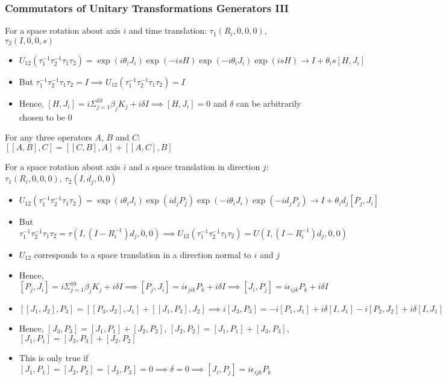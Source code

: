 \documentclass[8pt,t,mathserif,aspectratio=169]{beamer}
\begin{document}
\begin{frame}
  \frametitle{Commutators of Unitary Transformations Generators III}
  \vspace{1mm}
  For a space rotation about axis $i$ and time translation: $\tau_1(R_i,0,0,0)$, $\tau_2(I,0,0,s)$
  \begin{itemize}
    \item $U_{12}(\tau^{-1}_1 \tau^{-1}_2 \tau_1 \tau_2) = \exp(i \theta_i J_i) \exp(-i s H) \exp(-i \theta_i J_i) \exp(i s H) \to I + \theta_i s [H,J_i]$
    \item But $\tau^{-1}_1 \tau^{-1}_2 \tau_1 \tau_2 = I \implies U_{12}(\tau^{-1}_1 \tau^{-1}_2 \tau_1 \tau_2) = I$
    \item Hence, $[H,J_i] = i \Sigma_{j = 1}^{10} \beta_j K_j + i \delta I \implies [H,J_i] = 0$ and $\delta$ can be arbitrarily chosen to be $0$
  \end{itemize}
  For any three operators $A$, $B$ and $C$: $[[A,B],C] = [[C,B],A] + [[A,C],B]$
  
  For a space rotation about axis $i$ and a space translation in direction $j$: $\tau_1(R_i,0,0,0)$, $\tau_2(I,d_j,0,0)$
  \begin{itemize}
    \item $U_{12}(\tau^{-1}_1 \tau^{-1}_2 \tau_1 \tau_2) = \exp(i \theta_i J_i) \exp(i d_j P_j) \exp(-i \theta_i J_i) \exp(-i d_j P_j) \to I + \theta_i d_j [P_j,J_i]$
    \item But $\tau^{-1}_1 \tau^{-1}_2 \tau_1 \tau_2 = \tau(I,(I - R^{-1}_i)d_j,0,0) \implies U_{12}(\tau^{-1}_1 \tau^{-1}_2 \tau_1 \tau_2) = U(I,(I - R^{-1}_i)d_j,0,0)$
    \item $U_{12}$ corresponds to a space translation in a direction normal to $i$ and $j$ 
    \item Hence, $[P_j,J_i] = i \Sigma_{j = 1}^{10} \beta_j K_j + i \delta I \implies [P_j,J_i] = i \epsilon_{jik} P_k + i \delta I \implies [J_i,P_j] = i \epsilon_{ijk} P_k + i \delta I$
    \item $[[J_1,J_2],P_3] = [[P_3,J_2],J_1] + [[J_1,P_3],J_2] \implies i[J_3,P_3] = -i[P_1,J_1] + i \delta [I,J_1] - i[P_2,J_2] + i \delta [I,J_1]$
    \item Hence, $[J_3,P_3] = [J_1,P_1] + [J_2,P_2]$, $[J_2,P_2] = [J_1,P_1] + [J_3,P_3]$, $[J_1,P_1] = [J_3,P_3] + [J_2,P_2]$
    \item This is only true if $[J_1,P_1] = [J_2,P_2] = [J_3,P_3] = 0 \implies \delta = 0 \implies [J_i,P_j] = i \epsilon_{ijk} P_k$
  \end{itemize}

\end{frame}
\end{document}
